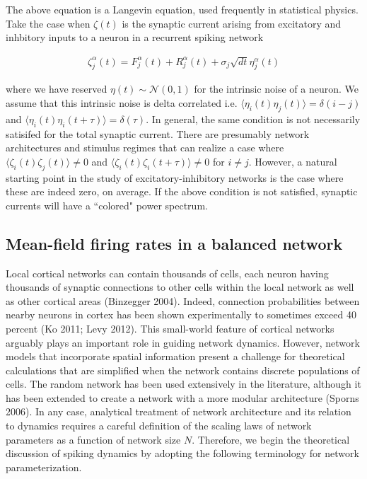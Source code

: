 \documentclass{ucetd}
\begin{document}
The above equation is a Langevin equation, used frequently in statistical physics. Take the case when $\zeta(t)$ is  the synaptic current arising from excitatory and inhbitory inputs to a neuron in a recurrent spiking network

\begin{align}
\zeta_{j}^{\alpha}(t) = F_{j}^{\alpha}(t) + R_{j}^{\alpha}(t) + \sigma_{j}\sqrt{dt}\eta_{j}^{\alpha}(t)
\end{align}

where we have reserved $\eta(t) \sim \mathcal{N}(0,1)$ for the intrinsic noise of a neuron. We assume that this intrinsic noise is delta correlated i.e. $\langle \eta_{i}(t)\eta_{j}(t)\rangle = \delta(i-j)$ and $\langle \eta_{i}(t)\eta_{i}(t+\tau)\rangle = \delta(\tau)$. In general, the same condition is not necessarily satisifed for the total synaptic current. There are presumably network architectures and stimulus regimes that can realize a case where $\langle \zeta_{i}(t)\zeta_{j}(t)\rangle \neq 0$ and $\langle \zeta_{i}(t)\zeta_{i}(t+\tau)\rangle \neq 0$ for $i \neq j$. However, a natural starting point in the study of excitatory-inhibitory networks is the case where these are indeed zero, on average. If the above condition is not satisfied, synaptic currents will have a ``colored" power spectrum. 

\subsection{Mean-field firing rates in a balanced network}

Local cortical networks can contain thousands of cells, each neuron having thousands of synaptic connections to other cells within the local network as well as other cortical areas (Binzegger 2004). Indeed, connection probabilities between nearby neurons in cortex has been shown experimentally to sometimes exceed 40 percent (Ko 2011; Levy 2012). This small-world feature of cortical networks arguably plays an important role in guiding network dynamics. However, network models that incorporate spatial information present a challenge for theoretical calculations that are simplified when the network contains discrete populations of cells. The random network has been used extensively in the literature, although it has been extended to create a network with a more modular architecture (Sporns 2006). In any case, analytical treatment of network architecture and its relation to dynamics requires a careful definition of the scaling laws of network parameters as a function of network size $N$. Therefore, we begin the theoretical discussion of spiking dynamics by adopting the following terminology for network parameterization. 
\end{document}
